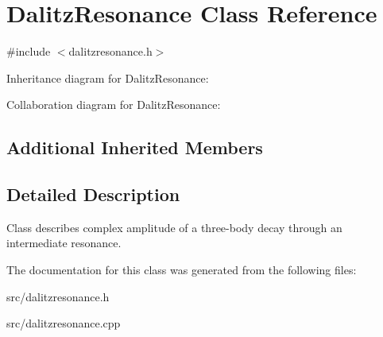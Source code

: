 \hypertarget{class_dalitz_resonance}{}\section{Dalitz\+Resonance Class Reference}
\label{class_dalitz_resonance}


{\ttfamily \#include $<$dalitzresonance.\+h$>$}



Inheritance diagram for Dalitz\+Resonance\+:


Collaboration diagram for Dalitz\+Resonance\+:
\subsection*{Additional Inherited Members}


\subsection{Detailed Description}
Class describes complex amplitude of a three-\/body decay through an intermediate resonance. 

The documentation for this class was generated from the following files\+:\begin{DoxyCompactItemize}
\item 
src/dalitzresonance.\+h\item 
src/dalitzresonance.\+cpp\end{DoxyCompactItemize}
